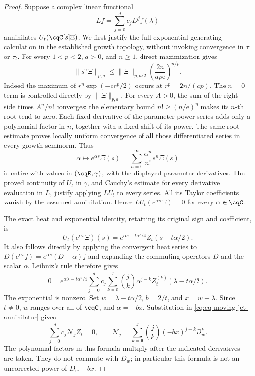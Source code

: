 \begin{proof}
Suppose a complex linear functional
\[
 Lf=\sum_{j=0}^d c_jD^jf(\lambda)
\]
annihilates $U_t(\cqC[s]\Xi)$. We first justify the full
exponential generating calculation in the established growth
topology, without invoking convergence in $\tau$ or $\tau_t$.
For every $1<p<2$, $a>0$, and $n\ge1$, direct maximization gives
\begin{equation}
 \|s^n\Xi\|_{p,a}
 \le\|\Xi\|_{p,a/2}
       \left(\frac{2n}{ap\mathrm e}\right)^{n/p}.
 \label{eq:cq-exponential-jet-convergence}
\end{equation}
Indeed the maximum of $r^n\exp(-ar^p/2)$ occurs at
$r^p=2n/(ap)$. The $n=0$ term is controlled directly by
$\|\Xi\|_{p,a}$. For every $A>0$, the sum of the right side
times $A^n/n!$ converges: the elementary bound
$n!\ge(n/\mathrm e)^n$ makes its $n$-th root tend to zero.
Each fixed derivative of the parameter power series adds only
a polynomial factor in $n$, together with a fixed shift of its
power. The same root estimate proves locally uniform convergence
of all those differentiated series in every growth seminorm.
Thus
\[
 \alpha\longmapsto e^{\alpha s}\Xi(s)
   =\sum_{n=0}^\infty\frac{\alpha^n}{n!}s^n\Xi(s)
\]
is entire with values in $(\cqE,\gamma)$, with the displayed
parameter derivatives. The proved continuity of $U_t$ in
$\gamma$, and Cauchy's estimate for every derivative evaluation
in $L$, justify applying $LU_t$ to every series. All its Taylor
coefficients vanish by the assumed annihilation. Hence
$LU_t(e^{\alpha s}\Xi)=0$ for every $\alpha\in\cqC$.

The exact heat and exponential identity, retaining its original
sign and coefficient, is
\[
 U_t(e^{\alpha s}\Xi)(s)
  =e^{\alpha s-t\alpha^2/4}Z_t(s-t\alpha/2).
\]
It also follows directly by applying the convergent heat series
to $D(e^{\alpha s}f)=e^{\alpha s}(D+\alpha)f$ and expanding
the commuting operators $D$ and the scalar $\alpha$.
Leibniz's rule therefore gives
\begin{equation}
 0=e^{\alpha\lambda-t\alpha^2/4}
   \sum_{j=0}^d c_j\sum_{k=0}^j\binom jk
      \alpha^{j-k}Z_t^{(k)}(\lambda-t\alpha/2).
 \label{eq:cq-moving-jet-annihilator}
\end{equation}
The exponential is nonzero. Set $w=\lambda-t\alpha/2$,
$b=2/t$, and $x=w-\lambda$. Since $t\ne0$, $w$ ranges
over all of $\cqC$, and $\alpha=-bx$. Substitution in
\eqref{eq:cq-moving-jet-annihilator} gives
\begin{equation}
 \sum_{j=0}^d c_j\mathcal N_jZ_t=0,
 \qquad
 \mathcal N_j=\sum_{k=0}^j\binom jk(-bx)^{j-k}D_w^k.
 \label{eq:cq-moving-jet-normal-order}
\end{equation}
The polynomial factors in this formula multiply after the
indicated derivatives are taken. They do not commute with
$D_w$; in particular this formula is not an uncorrected
power of $D_w-bx$.


\end{proof}
